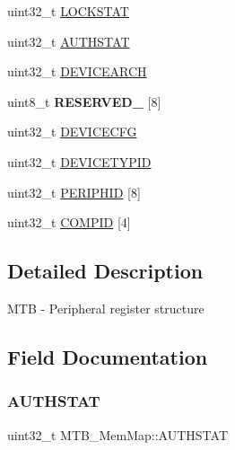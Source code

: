 \begin{DoxyCompactItemize}
\item 
uint32\+\_\+t \hyperlink{struct_m_t_b___mem_map_aac267fb66879aa477f7e0185507d688b}{L\+O\+C\+K\+S\+T\+AT}
\item 
uint32\+\_\+t \hyperlink{struct_m_t_b___mem_map_a5bc0007724226eb21df485ee381283e1}{A\+U\+T\+H\+S\+T\+AT}
\item 
uint32\+\_\+t \hyperlink{struct_m_t_b___mem_map_a64a9fe1c83fa72b2b38696ed80856b73}{D\+E\+V\+I\+C\+E\+A\+R\+CH}
\item 
\mbox{\label{struct_m_t_b___mem_map_adaf45585328ad77c4b9c56ded53c3acc}} 
uint8\+\_\+t {\bfseries R\+E\+S\+E\+R\+V\+E\+D\+\_} \mbox{[}8\mbox{]}
\item 
uint32\+\_\+t \hyperlink{struct_m_t_b___mem_map_a85b25744edf0f8a61d1d40bdf636e87e}{D\+E\+V\+I\+C\+E\+C\+FG}
\item 
uint32\+\_\+t \hyperlink{struct_m_t_b___mem_map_ae15d7775b4603c2f81ab69dcd560c523}{D\+E\+V\+I\+C\+E\+T\+Y\+P\+ID}
\item 
uint32\+\_\+t \hyperlink{struct_m_t_b___mem_map_a1e121406a44ce4c5261292e960a86e29}{P\+E\+R\+I\+P\+H\+ID} \mbox{[}8\mbox{]}
\item 
uint32\+\_\+t \hyperlink{struct_m_t_b___mem_map_aad4a8dcad1e9b3d04375b85c6c37f09f}{C\+O\+M\+P\+ID} \mbox{[}4\mbox{]}
\end{DoxyCompactItemize}


\subsection{Detailed Description}
M\+TB -\/ Peripheral register structure 

\subsection{Field Documentation}
\mbox{\label{struct_m_t_b___mem_map_a5bc0007724226eb21df485ee381283e1}} 
\subsubsection{\texorpdfstring{A\+U\+T\+H\+S\+T\+AT}{AUTHSTAT}}
{\footnotesize\ttfamily uint32\+\_\+t M\+T\+B\+\_\+\+Mem\+Map\+::\+A\+U\+T\+H\+S\+T\+AT}

